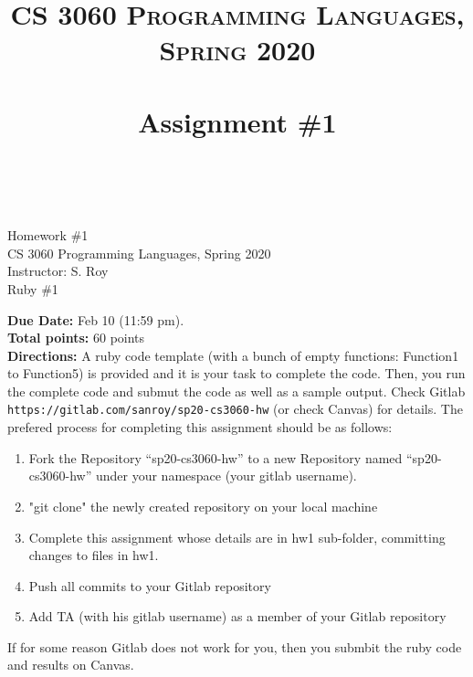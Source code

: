 \documentclass[paper=letter, fontsize=11pt]{scrartcl} %
\title{ 
    \normalfont \normalsize 
    \textsc{CS 3060 Programming Languages, Spring 2020} \\ [25pt] %
    \horrule{0.5pt} \\[0.4cm] %
    \huge Assignment \#1  \\ %
    \horrule{2pt} \\[0.5cm] %
}
\begin{document}
    \begin{center}
         Homework \#1\\
        \small CS 3060 Programming Languages, Spring 2020 \\
        \small Instructor: S. Roy \\
        \huge Ruby \#1
    \end{center}
    
    \textbf{Due Date:}  Feb 10 (11:59 pm).\\

    \textbf{Total points:} 60 points \\

    \textbf{Directions:} A ruby code template (with a bunch of empty functions: Function1 to Function5) is provided and it is your task to complete the code. 
Then, you run the complete code and submut the code as well as a sample output. 
Check Gitlab \@ \texttt{https://gitlab.com/sanroy/sp20-cs3060-hw} (or check Canvas) for details. 
The prefered process for completing this assignment should be as follows:

    \begin{enumerate}[noitemsep]
        \item Fork the Repository ``sp20-cs3060-hw'' to a new Repository named ``sp20-cs3060-hw'' under your namespace (your gitlab username).
        \item "git clone" the newly created repository on your local machine
        \item Complete this assignment whose details are in hw1 sub-folder, committing changes to files in hw1. 
        \item Push all commits to your Gitlab repository
        \item Add TA (with his gitlab username) as a member of your Gitlab repository
    \end{enumerate}

If for some reason Gitlab does not work for you, then you submbit the ruby code and results on Canvas.
\end{document}
